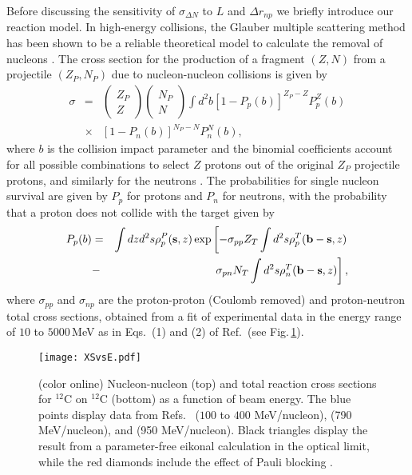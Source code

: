 \documentclass[english,aps,prl,twocolumn,superscriptaddress]{revtex4}
\begin{document}
Before discussing the sensitivity of $\sigma_{\Delta N}$ to $L$ and $\Delta r_{np}$ we briefly introduce our reaction model. In high-energy collisions, the Glauber multiple scattering method has been shown to be a reliable theoretical model to calculate the removal of nucleons \cite{BD04,Mill07}. The cross section for the production of a fragment $(Z,N)$ from a projectile $(Z_P,N_P)$  due to nucleon-nucleon collisions is given by 
%
\begin{eqnarray}
\sigma&=&
\left(
\begin{array}{c}Z_P \\ Z
\end{array}
\right)
\left(
\begin{array}{c}N_P \\ N
\end{array}
\right)
\int d^2 b \left[ 1-P_p(b)\right]^{Z_P-Z}P_p^Z(b) \nonumber \\
&\times& \left[ 1-P_n(b)\right]^{N_P-N}P_n^N(b), \label{sigma}
\end{eqnarray} 
%
where $b$ is the collision impact parameter and the binomial coefficients account for all possible combinations to select $Z$ protons out of the original $Z_P$ projectile protons, and similarly for the neutrons \cite{BD04,Mill07}. The probabilities for single nucleon survival are given by $P_p$ for protons and $P_n$ for neutrons, with the probability that a proton does not collide with the target given by  \cite{BD04,Mill07}
%
\begin{eqnarray}
P_p(b)&=&\int dzd^2s \rho_p^P({\bf s},z) \exp\left[ -\sigma_{pp} Z_T\int d^2s \rho_p^T({\bf b-s},z) \right. \nonumber \\
&-&\left. \sigma_{pn} N_T\int d^2s \rho_n^T({\bf b-s},z) \right],  \label{ppb}
\end{eqnarray} 
%
where $\sigma_{pp}$ and $\sigma_{np}$ are the proton-proton (Coulomb removed) and proton-neutron total cross sections, obtained from a fit of experimental data in the energy range of $10$ to $5000$\,MeV as in Eqs.\ (1) and (2) of Ref.\,\cite{BC10} (see Fig.\,\ref{fig1}).
%
\begin{figure}[t]
\texttt{[image: XSvsE.pdf]}
\caption{(color online) Nucleon-nucleon (top) and total reaction cross sections for $^{12}$C on $^{12}$C (bottom) as a function of beam energy. The blue points display data from Refs.\ \cite{Tak09} ($100$ to $400$ MeV/nucleon), \cite{Tan90} (790 MeV/nucleon), and  \cite{Oza01} (950 MeV/nucleon). Black triangles display the result from a parameter-free eikonal calculation in the optical limit, while the red diamonds include the effect of Pauli blocking \cite{Schi17}.}
\label{fig1}
\end{figure}
\end{document}
